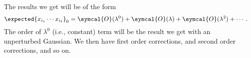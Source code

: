 \documentclass[fleqn]{NotesClass}
\newcommand{\order}{\symcal{O}}
\begin{document}
    The results we get will be of the form
    \begin{equation}
        \expected{x_{i_1} \dotsm x_{i_\ell}}_0 = \order(\lambda^0) + \order(\lambda) + \order(\lambda^2) + \dotsb.
    \end{equation}
    The order of \(\lambda^0\) (i.e., constant) term will be the result we get with an unperturbed Gaussian.
    We then have first order corrections, and second order corrections, and so on.
    
    
    \appendixpage
    \begin{appendices}
        
        
    \end{appendices}
    
    \backmatter
    \renewcommand{\glossaryname}{Acronyms}
    \printglossary[acronym]
    \printindex
\end{document}
